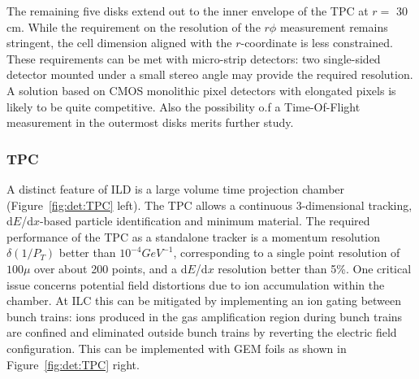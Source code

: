 The remaining five disks extend out to the inner envelope of the TPC at $r=$ 30 cm. While the requirement on the resolution of the $r\phi$ measurement remains stringent, the cell dimension aligned with the $r$-coordinate is less constrained. These requirements can be met with micro-strip detectors: two single-sided detector mounted under a small stereo angle may provide the required resolution. A solution based on CMOS monolithic pixel detectors with elongated pixels is likely to be quite competitive. Also the possibility o.f a Time-Of-Flight measurement in the outermost disks merits further study.

\vspace{1cm}
\subsubsection*{\bf TPC}

A distinct feature of ILD is a large volume time projection chamber (Figure~\ref{fig:det:TPC} left). The TPC allows a continuous 3-dimensional tracking, d$E$/d$x$-based particle identification and minimum material. The required performance of the TPC as a standalone tracker is a momentum resolution $\delta(1/P_T)$ better than $10^{-4} GeV^{-1}$, corresponding to a single point resolution of $100\mu$ over about 200 points, and a d$E$/d$x$ resolution better than 5\%. One critical issue concerns potential field distortions due to ion accumulation within the chamber. At ILC this can be mitigated by implementing an ion gating between bunch trains: ions produced in the gas amplification region during bunch trains are confined and eliminated outside bunch trains by reverting the electric field configuration. This can be implemented with GEM foils as shown in Figure~\ref{fig:det:TPC} right.


